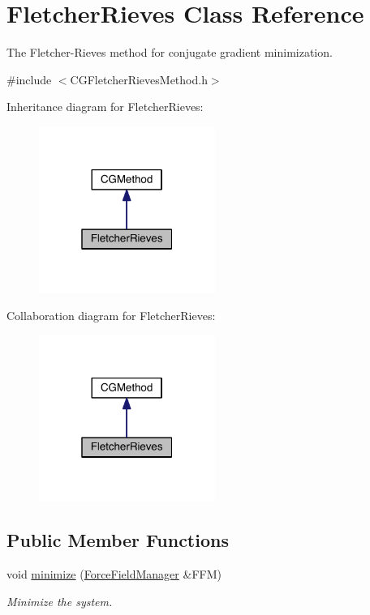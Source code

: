 \hypertarget{classFletcherRieves}{\section{Fletcher\+Rieves Class Reference}
\label{classFletcherRieves}
}


The Fletcher-\/\+Rieves method for conjugate gradient minimization.  




{\ttfamily \#include $<$C\+G\+Fletcher\+Rieves\+Method.\+h$>$}



Inheritance diagram for Fletcher\+Rieves\+:\nopagebreak
\begin{figure}[H]
\begin{center}
\leavevmode
\includegraphics[width=163pt]{classFletcherRieves__inherit__graph}
\end{center}
\end{figure}


Collaboration diagram for Fletcher\+Rieves\+:\nopagebreak
\begin{figure}[H]
\begin{center}
\leavevmode
\includegraphics[width=163pt]{classFletcherRieves__coll__graph}
\end{center}
\end{figure}
\subsection*{Public Member Functions}
\begin{DoxyCompactItemize}
\item 
void \hyperlink{classFletcherRieves_a022e95e7331cb494bc281a5f53a7198a}{minimize} (\hyperlink{classForceFieldManager}{Force\+Field\+Manager} \&F\+F\+M)
\begin{DoxyCompactList}\small\item\em Minimize the system. \end{DoxyCompactList}\end{DoxyCompactItemize}
